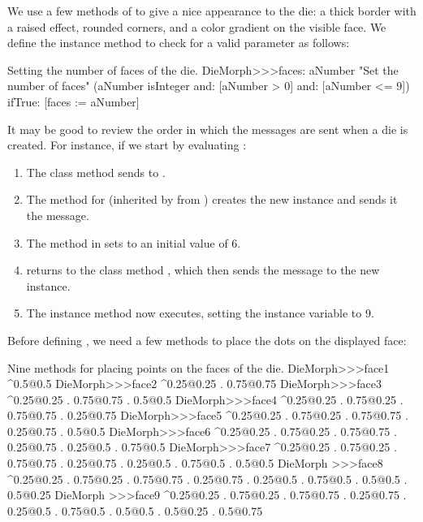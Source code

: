 \documentclass[a4paper,10pt,twoside]{book}
\begin{document}
We use a few methods of  to give a nice appearance to the die: a thick border with a raised effect, rounded corners, and a color gradient on the visible face.
We define the instance method  to check for a valid parameter as follows:
\begin{method}{Setting the number of faces of the die.}
DieMorph>>>faces: aNumber
	"Set the number of faces"
	(aNumber isInteger
			and: [aNumber > 0]
			and: [aNumber <= 9])
		ifTrue: [faces := aNumber]
\end{method}

It may be good to review the order in which the messages are sent when a die is created. For instance, if we start by
evaluating :
\begin{enumerate}
	\item The class method  sends  to .
	\item The method for  (inherited by  from ) creates the new instance and sends it the  message.
	\item The  method in  sets  to an initial value of 6.
	\item {} returns to the class method , which then sends the message  to the new instance.
	\item The instance method  now executes, setting the  instance variable to 9.
\end{enumerate}

Before defining , we need a few methods to place the dots on the displayed face:
\begin{methods}{Nine methods for placing points on the faces of the die.}
DieMorph>>>face1
	^{0.5@0.5}
DieMorph>>>face2
	^{0.25@0.25 . 0.75@0.75}
DieMorph>>>face3
	^{0.25@0.25 . 0.75@0.75 . 0.5@0.5}
DieMorph>>>face4
	^{0.25@0.25 . 0.75@0.25 . 0.75@0.75 . 0.25@0.75}
DieMorph>>>face5
	^{0.25@0.25 . 0.75@0.25 . 0.75@0.75 . 0.25@0.75 . 0.5@0.5}
DieMorph>>>face6
	^{0.25@0.25 . 0.75@0.25 . 0.75@0.75 . 0.25@0.75 . 0.25@0.5 . 0.75@0.5}
DieMorph>>>face7
	^{0.25@0.25 . 0.75@0.25 . 0.75@0.75 . 0.25@0.75 . 0.25@0.5 . 0.75@0.5 . 0.5@0.5}
DieMorph >>>face8
	^{0.25@0.25 . 0.75@0.25 . 0.75@0.75 . 0.25@0.75 . 0.25@0.5 . 0.75@0.5 . 0.5@0.5 . 0.5@0.25}
DieMorph >>>face9
	^{0.25@0.25 . 0.75@0.25 . 0.75@0.75 . 0.25@0.75 . 0.25@0.5 . 0.75@0.5 . 0.5@0.5 . 0.5@0.25 . 0.5@0.75}
\end{methods}
\end{document}
